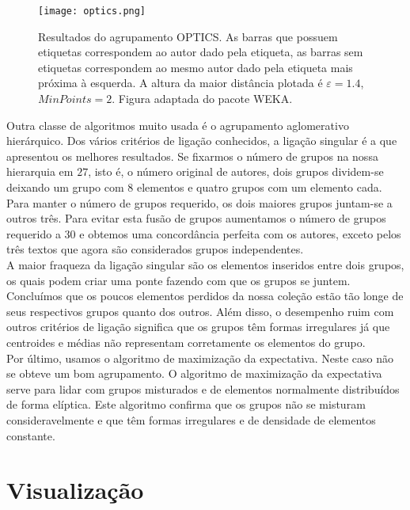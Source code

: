 \documentclass[a4paper,openright,12pt]{report} %
\begin{document}
\begin{figure}[t]%
\centering
\texttt{[image: optics.png]}
\caption{Resultados do agrupamento OPTICS. As barras que possuem etiquetas correspondem ao autor dado pela etiqueta, as barras sem etiquetas correspondem ao mesmo autor dado pela etiqueta mais pr\'oxima \`a esquerda. A altura da maior dist\^ancia plotada \'e $\varepsilon=1.4$, $MinPoints=2$. Figura adaptada do pacote WEKA.}
\label{fig:optics}
\end{figure}

Outra classe de algoritmos muito usada \'e o agrupamento aglomerativo hier\'arquico. Dos v\'arios crit\'erios de liga\c c\~ao conhecidos, a liga\c c\~ao singular \'e a que apresentou os melhores resultados. Se fixarmos o n\'umero de grupos na nossa hierarquia em $27$, isto \'e, o n\'umero original de autores, dois grupos dividem-se deixando um grupo com $8$ elementos e quatro grupos com um elemento cada. Para manter o n\'umero de grupos requerido, os dois maiores grupos juntam-se a outros tr\^es. Para evitar esta fus\~ao de grupos aumentamos o n\'umero de grupos requerido a $30$ e obtemos uma concord\^ancia perfeita com os autores, exceto pelos tr\^es textos que agora s\~ao considerados grupos independentes.\\

A maior fraqueza da liga\c c\~ao singular s\~ao os elementos inseridos entre dois grupos, os quais podem criar uma ponte fazendo com que os grupos se juntem. Conclu\'imos que os poucos elementos perdidos da nossa cole\c c\~ao est\~ao t\~ao longe de seus respectivos grupos quanto dos outros. Al\'em disso, o desempenho ruim com outros crit\'erios de liga\c c\~ao significa que os grupos t\^em formas irregulares j\'a que centroides e m\'edias n\~ao representam corretamente os elementos do grupo.\\

Por \'ultimo, usamos o algoritmo de maximiza\c c\~ao da expectativa. Neste caso n\~ao se obteve um bom agrupamento. O algoritmo de maximiza\c c\~ao da expectativa serve para lidar com grupos misturados e de elementos normalmente distribu\'idos de forma el\'iptica. Este algoritmo confirma que os grupos n\~ao se misturam consideravelmente e que t\^em formas irregulares e de densidade de elementos constante.\\


\section{Visualiza\c c\~ao}
\end{document}
